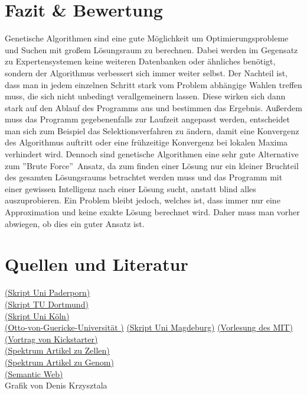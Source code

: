 \section{Fazit \& Bewertung}
Genetische Algorithmen sind eine gute Möglichkeit um Optimierungsprobleme und Suchen mit großem Lösungsraum zu berechnen. Dabei werden im Gegensatz zu Expertensystemen keine weiteren Datenbanken oder ähnliches benötigt, sondern der Algorithmus verbessert sich immer weiter selbst. Der Nachteil ist, dass man in jedem  einzelnen Schritt stark vom Problem abhängige Wahlen treffen muss, die sich nicht unbedingt verallgemeinern lassen. Diese wirken sich dann stark auf den Ablauf des Programms aus und bestimmen das Ergebnis. Außerdem muss das Programm gegebenenfalls zur Laufzeit angepasst werden, entscheidet man  sich zum Beispiel das Selektionsverfahren zu ändern, damit eine Konvergenz des Algorithmus auftritt oder eine frühzeitige Konvergenz bei lokalen Maxima verhindert wird. Dennoch sind genetische Algorithmen eine sehr gute Alternative zum \textquotedblright Brute Force\textquotedblright\ Ansatz, da zum finden einer Lösung nur ein kleiner Bruchteil des gesamten Lösungsraums betrachtet werden muss und das Programm mit einer gewissen Intelligenz nach einer Lösung sucht, anstatt blind alles auszuprobieren. Ein Problem bleibt jedoch, welches ist, dass immer nur eine Approximation und keine exakte Lösung berechnet wird. Daher muss man vorher abwiegen, ob dies ein guter Ansatz ist.

\section{Quellen und Literatur}

\href{http://www2.cs.uni-paderborn.de/cs/ag-klbue/de/courses/ws04/ea/students/ga_report.pdf}{(Skript Uni Paderporn)}\\
\href{http://www.mathematik.tu-dortmund.de/papers/MehmetiAmreinKulmsMacinLoenserBogonosWaidhas2014.pdf}{(Skript TU Dortmund)}\\
\href{http://www.spinfo.phil-fak.uni-koeln.de/fileadmin/spinfo/ki10/Genetische_algorithmen.pdf}{(Skript Uni Köln)}\\
\href{http://www.borgelt.net/slides/ga.pdf}{(Otto-von-Guericke-Universität )}
\href{http://www-e.uni-magdeburg.de/harbich/genetische_algorithmen/genetische_algorithmen.pdf}{(Skript Uni Magdeburg)}
\href{https://www.youtube.com/watch?v=kHyNqSnzP8Y}{(Vorlesung des MIT)}\\
\href{https://www.youtube.com/watch?v=6l6b78Y4V7Y}{(Vortrag von Kickstarter)}\\
\href{http://www.spektrum.de/lexikon/neurowissenschaft/zelle/14161}{(Spektrum Artikel zu Zellen)}\\
\href{http://www.spektrum.de/lexikon/biologie/genom/27365}{(Spektrum Artikel zu Genom)}\\
\href{http://semantic-web-grundlagen.de/w/images/e/e9/IntroAI-V06.pdf}{(Semantic Web)}\\
Grafik von Denis Krzysztala\\
